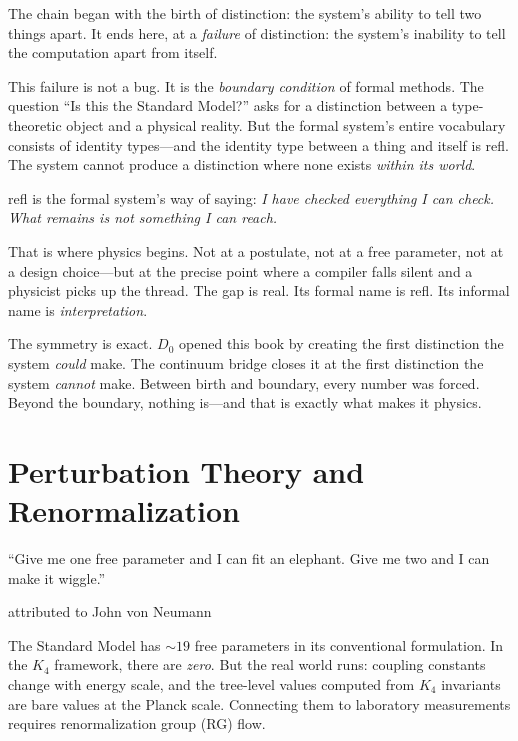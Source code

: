 \documentclass[11pt,a4paper]{book}
\def\texttt#1{#1}%
\begin{document}
The chain began with the birth of distinction: the system's ability to tell two things apart. It ends here, at a \emph{failure} of distinction: the system's inability to tell the computation apart from itself.

This failure is not a bug. It is the \emph{boundary condition} of formal methods. The question ``Is this the Standard Model?'' asks for a distinction between a type-theoretic object and a physical reality. But the formal system's entire vocabulary consists of identity types---and the identity type between a thing and itself is \texttt{refl}. The system cannot produce a distinction where none exists \emph{within its world}.

\texttt{refl} is the formal system's way of saying: \emph{I have checked everything I can check. What remains is not something I can reach.}

That is where physics begins. Not at a postulate, not at a free parameter, not at a design choice---but at the precise point where a compiler falls silent and a physicist picks up the thread. The gap is real. Its formal name is \texttt{refl}. Its informal name is \emph{interpretation}.

The symmetry is exact. $D_0$ opened this book by creating the first distinction the system \emph{could} make. The continuum bridge closes it at the first distinction the system \emph{cannot} make. Between birth and boundary, every number was forced. Beyond the boundary, nothing is---and that is exactly what makes it physics.

\chapter{Perturbation Theory and Renormalization}
\label{ch:perturbation-rg}

\epigraph{``Give me one free parameter and I can fit an elephant. Give me two and I can make it wiggle.''}{attributed to John von Neumann}

The Standard Model has $\sim 19$ free parameters in its conventional formulation. In the $K_4$ framework, there are \emph{zero}. But the real world runs: coupling constants change with energy scale, and the tree-level values computed from $K_4$ invariants are bare values at the Planck scale. Connecting them to laboratory measurements requires renormalization group (RG) flow.
\end{document}
